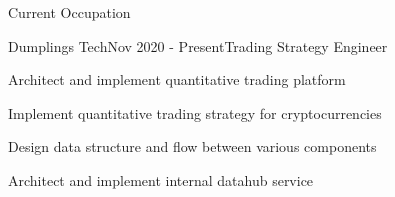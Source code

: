 \documentclass{resume} %
\begin{document}
\begin{rSection}{Current Occupation}

\begin{rSubsection}{Dumplings Tech}{Nov 2020 - Present}{Trading Strategy Engineer}{}{}
\begin{rSubsectionList}
\item Architect and implement quantitative trading platform
\item Implement quantitative trading strategy for cryptocurrencies
\item Design data structure and flow between various components 
\item Architect and implement internal datahub service
\end{rSubsectionList}
\end{rSubsection}
\end{rSection}
\end{document}
